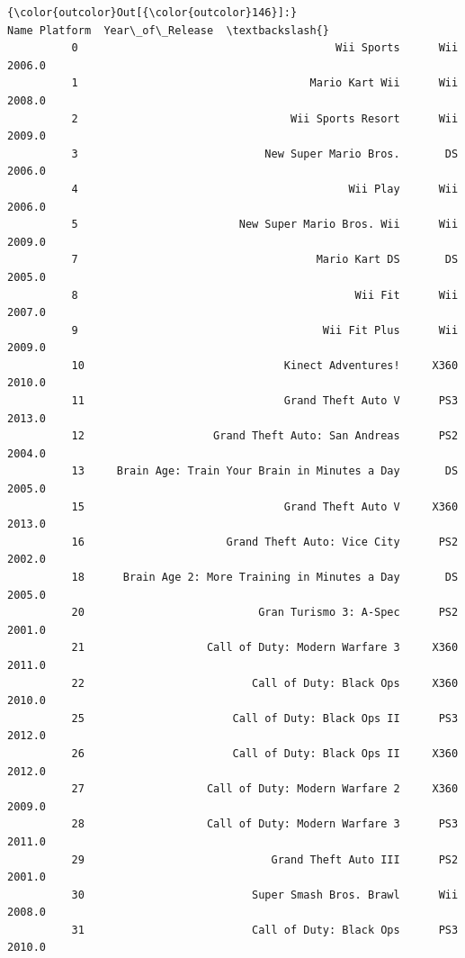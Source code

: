 \documentclass[11pt]{article}
\begin{document}
\begin{Verbatim}[commandchars=\\\{\}]
{\color{outcolor}Out[{\color{outcolor}146}]:}                                                Name Platform  Year\_of\_Release  \textbackslash{}
          0                                        Wii Sports      Wii           2006.0   
          1                                    Mario Kart Wii      Wii           2008.0   
          2                                 Wii Sports Resort      Wii           2009.0   
          3                             New Super Mario Bros.       DS           2006.0   
          4                                          Wii Play      Wii           2006.0   
          5                         New Super Mario Bros. Wii      Wii           2009.0   
          7                                     Mario Kart DS       DS           2005.0   
          8                                           Wii Fit      Wii           2007.0   
          9                                      Wii Fit Plus      Wii           2009.0   
          10                               Kinect Adventures!     X360           2010.0   
          11                               Grand Theft Auto V      PS3           2013.0   
          12                    Grand Theft Auto: San Andreas      PS2           2004.0   
          13     Brain Age: Train Your Brain in Minutes a Day       DS           2005.0   
          15                               Grand Theft Auto V     X360           2013.0   
          16                      Grand Theft Auto: Vice City      PS2           2002.0   
          18      Brain Age 2: More Training in Minutes a Day       DS           2005.0   
          20                           Gran Turismo 3: A-Spec      PS2           2001.0   
          21                   Call of Duty: Modern Warfare 3     X360           2011.0   
          22                          Call of Duty: Black Ops     X360           2010.0   
          25                       Call of Duty: Black Ops II      PS3           2012.0   
          26                       Call of Duty: Black Ops II     X360           2012.0   
          27                   Call of Duty: Modern Warfare 2     X360           2009.0   
          28                   Call of Duty: Modern Warfare 3      PS3           2011.0   
          29                             Grand Theft Auto III      PS2           2001.0   
          30                          Super Smash Bros. Brawl      Wii           2008.0   
          31                          Call of Duty: Black Ops      PS3           2010.0   

\end{Verbatim}
\end{document}
